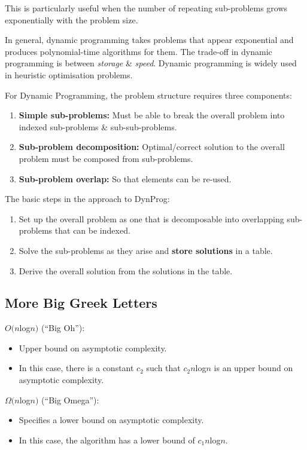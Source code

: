 \documentclass[11pt]{article}
\begin{document}
This is particularly useful when the number of repeating sub-problems grows exponentially with the problem 
size.

In general, dynamic programming takes problems that appear exponential and produces polynomial-time algorithms 
for them.
The trade-off in dynamic programming is between \textit{storage} \& \textit{speed}.
Dynamic programming is widely used in heuristic optimisation problems.

For Dynamic Programming, the problem structure requires three components:
\begin{enumerate}
    \item   \textbf{Simple sub-problems:} Must be able to break the overall problem into indexed sub-problems 
            \& sub-sub-problems. 
    \item   \textbf{Sub-problem decomposition:} Optimal/correct solution to the overall problem must be 
            composed from sub-problems.
    \item   \textbf{Sub-problem overlap:} So that elements can be re-used.
\end{enumerate}

The basic steps in the approach to DynProg: 
\begin{enumerate}
    \item   Set up the overall problem as one that is decomposable into overlapping sub-problems that can 
            be indexed. 
    \item   Solve the sub-problems as they arise and \textbf{store solutions} in a table.
    \item   Derive the overall solution from the solutions in the table.
\end{enumerate}

\subsection{More Big Greek Letters}
$O(n$log$n)$ (``Big Oh''): 
\begin{itemize}
    \item   Upper bound on asymptotic complexity. 
    \item   In this case, there is a constant $c_2$ such that $c_2 n$log$n$ is an upper bound on 
            asymptotic complexity. 
\end{itemize}

$\Omega(n$log$n)$ (``Big Omega''):
\begin{itemize}
    \item   Specifies a lower bound on asymptotic complexity. 
    \item   In this case, the algorithm has a lower bound of $c_1 n$log$n$. 
\end{itemize}
\end{document}
